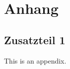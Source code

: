 \newpage
\appendix
\section{Anhang}

\subsection*{Zusatzteil 1} \label{anhang:zusatz1}

This is an appendix.

\clearpage